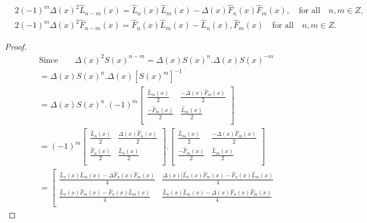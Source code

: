 \begin{lemma}
\begin{align*}
&2(-1)^m\Delta(x)^2 \widehat{L}_{n-m}(x)=\widehat{L}_{n}(x)\widehat{L}_{m}(x)-\Delta(x) \widehat{F}_{n}(x)\widehat{F}_{m}(x),\quad \text{for all}\quad n, m\in Z,\\&
2(-1)^m\Delta(x)^2 \widehat{F}_{n-m}(x)=\widehat{F}_{n}(x)\widehat{L}_{m}(x)-\widehat{L}_{n}(x),\widehat{F}_{m}(x)\quad \text{for all}\quad n, m\in Z.
\end{align*}
\end{lemma}
\begin{proof}
\begin{align*}
&\text{Since}\qquad
\Delta(x)^2 S(x)^{n-m}=\Delta(x) S(x)^n.\Delta(x) S(x)^{-m}\\
			 &=\Delta(x) S(x)^n.\Delta(x)[S(x)^{m}]^{-1}\\
			 &=\Delta(x) S(x)^n.(-1)^m{\left[
 \begin{array}{cc}
    \frac{\widehat{L}_{m}(x)}{2} & \frac{-\Delta(x) \widehat{F}_{m}(x)}{2} \\
    \frac{-\widehat{F}_{m}(x)}{2} & \frac{\widehat{L}_{m}(x)}{2} \\
	\end{array}
	\right]}\\
	&=(-1)^m{\left[
 \begin{array}{cc}
    \frac{\widehat{L}_{n}(x)}{2} & \frac{\Delta(x) \widehat{F}_{n}(x)}{2} \\
    \frac{\widehat{F}_{n}(x)}{2} & \frac{\widehat{L}_{n}(x)}{2} \\
	\end{array}
	\right]}.{\left[
 \begin{array}{cc}
    \frac{\widehat{L}_{m}(x)}{2} & \frac{-\Delta(x) \widehat{F}_{m}(x)}{2} \\
    \frac{-\widehat{F}_{m}(x)}{2} & \frac{\widehat{L}_{m}(x)}{2} \\
	\end{array}
	\right]}\\								
	&={\left[
 \begin{array}{cc}
    \frac{\widehat{L}_{n}(x)\widehat{L}_{m}(x)-\Delta \widehat{F}_{n}(x)\widehat{F}_{m}(x)}{4} & \frac{\Delta(x)[\widehat{L}_{n}(x)\widehat{F}_{m}(x)-\widehat{F}_{n}(x)\widehat{L}_{m}(x)}{4} \\
    \frac{\widehat{L}_{n}(x)\widehat{F}_{m}(x)-\widehat{F}_{n}(x)\widehat{L}_{m}(x)}{4} & \frac{\widehat{L}_{n}(x)\widehat{L}_{m}(x)-\Delta(x) \widehat{F}_{n}(x)\widehat{F}_{m}(x)}{4} \\

\end{array}}
\end{align*}
\end{proof}
